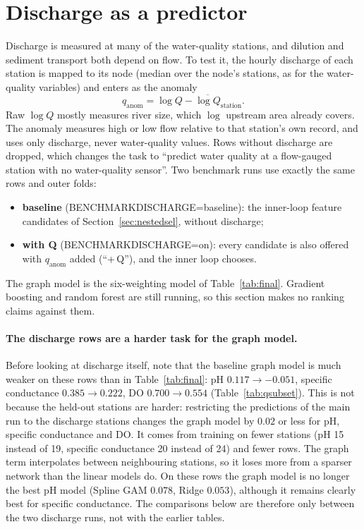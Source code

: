 \documentclass[11pt]{article}
\newcommand{\codeus}{\textunderscore\allowbreak}
\newcommand{\code}[1]{{\ttfamily\let\_\codeus #1}}
\begin{document}
\section{Discharge as a predictor}
\label{sec:discharge}

Discharge is measured at many of the water-quality stations, and dilution and sediment transport
both depend on flow. To test it, the hourly discharge of each station is mapped to its node (median
over the node's stations, as for the water-quality variables) and enters as the anomaly
\[
  q_{\text{anom}} = \log Q - \overline{\log Q}_{\text{station}} .
\]
Raw $\log Q$ mostly measures river size, which $\log$ upstream area already covers. The anomaly
measures high or low flow relative to that station's own record, and uses only discharge, never
water-quality values. Rows without discharge are dropped, which changes the task to ``predict water
quality at a flow-gauged station with no water-quality sensor''. Two benchmark runs use exactly the
same rows and outer folds:
\begin{itemize}
  \item \textbf{baseline} (\code{BENCHMARK\_DISCHARGE=baseline}): the inner-loop feature
        candidates of Section~\ref{sec:nestedsel}, without discharge;
  \item \textbf{with Q} (\code{BENCHMARK\_DISCHARGE=on}): every candidate is also offered with
        $q_{\text{anom}}$ added (``+\,Q''), and the inner loop chooses.
\end{itemize}
The graph model is the six-weighting model of Table~\ref{tab:final}. Gradient boosting and random
forest are still running, so this section makes no ranking claims against them.

\paragraph{The discharge rows are a harder task for the graph model.} Before looking at discharge
itself, note that the baseline graph model is much weaker on these rows than in
Table~\ref{tab:final}: pH $0.117\to-0.051$, specific conductance $0.385\to0.222$, DO
$0.700\to0.554$ (Table~\ref{tab:qsubset}). This is not because the held-out stations are harder:
restricting the predictions of the main run to the discharge stations changes the graph model by
$0.02$ or less for pH, specific conductance and DO. It comes from training on fewer stations (pH 15
instead of 19, specific conductance 20 instead of 24) and fewer rows. The graph term interpolates
between neighbouring stations, so it loses more from a sparser network than the linear models do.
On these rows the graph model is no longer the best pH model (Spline GAM $0.078$, Ridge $0.053$),
although it remains clearly best for specific conductance. The comparisons below are therefore only
between the two discharge runs, not with the earlier tables.
\end{document}
